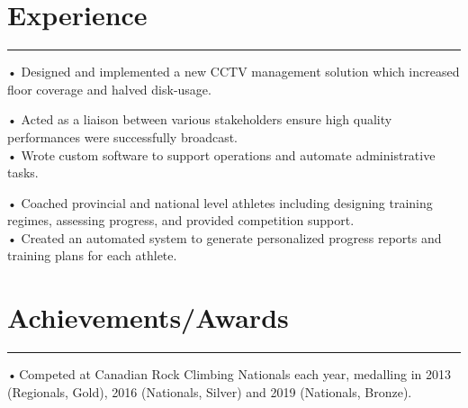 \documentclass[]{resume}
\begin{document}
\begin{minipage}[t]{0.66\textwidth}
\section{Experience}
\noindent\rule{12.5cm}{0.4pt}
 
\noindent
\hspace{3em}%
\begin{minipage}{0.85\textwidth\vspace{2pt}}
• Designed and implemented a new CCTV management solution which increased floor coverage and halved disk-usage.
\end{minipage}
\sectionsep

 
\noindent
\hspace{3em}%
\begin{minipage}{0.85\textwidth\vspace{2pt}}
• Acted as a liaison between various stakeholders ensure high quality performances were successfully broadcast.\\
• Wrote custom software to support operations and automate administrative tasks.
\end{minipage}
\sectionsep

 
\noindent
\hspace{3em}%
\begin{minipage}{0.85\textwidth\vspace{2pt}}
• Coached provincial and national level athletes including designing training regimes, assessing progress, and provided competition support.\\
• Created an automated system to generate personalized progress reports and training plans for each athlete.
\end{minipage}
\sectionsep

\section{Achievements/Awards} 
\noindent\rule{12.5cm}{0.4pt}
 
\descript{}
\noindent
\hspace{3em}%
\begin{minipage}{0.85\textwidth\vspace{2pt}}
•\,Competed at Canadian Rock Climbing Nationals each year, medalling in 2013 (Regionals, Gold), 2016 (Nationals, Silver) and 2019 (Nationals, Bronze). 
\end{minipage}
\sectionsep


\end{minipage}
\end{document}
